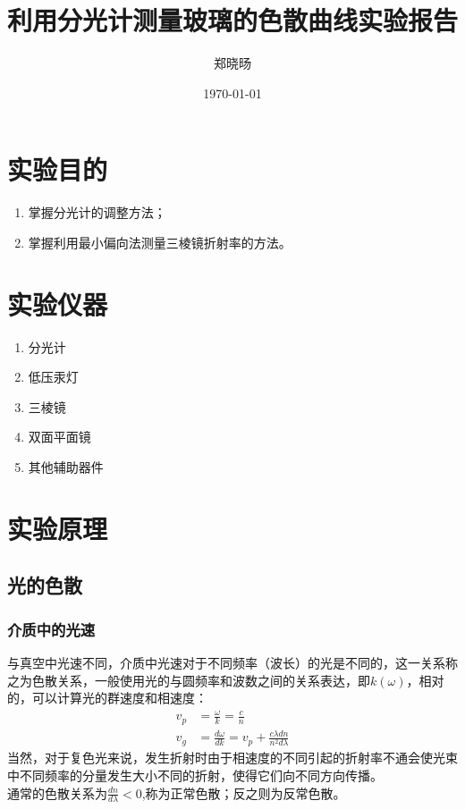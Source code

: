 \documentclass[UTF8]{ctexart}
\title{利用分光计测量玻璃的色散曲线实验报告}
\author{郑晓旸}
\date{\today}
\begin{document}
\fancyfoot[C]{\thepage}

\maketitle
\tableofcontents
\newpage

\section{实验目的}
    \begin{enumerate}
            \item 掌握分光计的调整方法；
            \item 掌握利用最小偏向法测量三棱镜折射率的方法。
    \end{enumerate} 


\section{实验仪器}
\begin{enumerate}
    \item 分光计
    \item 低压汞灯
    \item 三棱镜
    \item 双面平面镜
    \item 其他辅助器件
\end{enumerate}

\section{实验原理}
\subsection{光的色散}
\subsubsection{介质中的光速}
与真空中光速不同，介质中光速对于不同频率（波长）的光是不同的，这一关系称之为色散关系，一般使用光的与圆频率和波数之间的关系表达，即$k(\omega)$，相对的，可以计算光的群速度和相速度：\\
\begin{align}
    v_p&=\frac{\omega}{k}=\frac{c}{n}\\v_g&=\frac{d\omega}{dk}=v_p+\frac{c\lambda dn}{n^2d\lambda}
\end{align}
当然，对于复色光来说，发生折射时由于相速度的不同引起的折射率不通会使光束中不同频率的分量发生大小不同的折射，使得它们向不同方向传播。
\\
通常的色散关系为$\frac{dn}{d\lambda}<0$,称为正常色散；反之则为反常色散。
\end{document}
